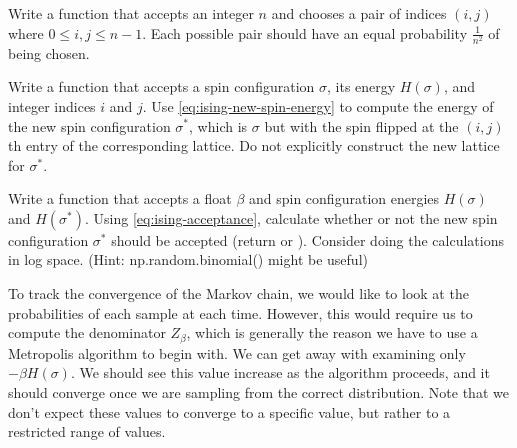 \begin{problem} %
Write a function that accepts an integer $n$ and chooses a pair of indices $(i,j)$ where $0 \le i,j \le n-1$.
Each possible pair should have an equal probability $\frac{1}{n^2}$ of being chosen.
\label{prob:ising-flip-site}
\end{problem}

\begin{problem} %
Write a function that accepts a spin configuration $\sigma$, its energy $H(\sigma)$, and integer indices $i$ and $j$.
Use \eqref{eq:ising-new-spin-energy} to compute the energy of the new spin configuration $\sigma^*$, which is $\sigma$ but with the spin flipped at the $(i,j)$th entry of the corresponding lattice.
Do not explicitly construct the new lattice for $\sigma^*$.
\label{prob:ising-new-energy}
\end{problem}

\begin{problem} %
Write a function that accepts a float $\beta$ and spin configuration energies $H(\sigma)$ and $H(\sigma^*)$.
Using \eqref{eq:ising-acceptance}, calculate whether or not the new spin configuration $\sigma^*$ should be accepted (return  or ).
Consider doing the calculations in log space.
(Hint: np.random.binomial() might be useful)
\label{prob:ising-acceptance}
\end{problem}

To track the convergence of the Markov chain, we would like to look at the probabilities of each sample at each time. However, this would require us to compute the denominator $Z_{\beta}$, which is generally the reason we have to use a Metropolis algorithm to begin with.
We can get away with examining only $-\beta H(\sigma)$.
We should see this value increase as the algorithm proceeds, and it should converge once we are sampling from the correct distribution.
Note that we don't expect these values to converge to a specific value, but rather to a restricted range of values.

